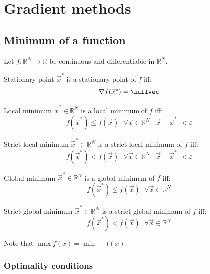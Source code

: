 \chapter{Gradient methods}


\section{Minimum of a function}

Let $f: \mathbb{R}^N \rightarrow \mathbb{R}$ be continuous and differentiable in $\mathbb{R}^N$.
\begin{descriptionlist}
    \item[Stationary point] 
        $\vec{x}^*$ is a stationary point of $f$ iff: 
        \[ \nabla f(\vec{x}^*) = \nullvec \]

    \item[Local minimum] 
        $\vec{x}^* \in \mathbb{R}^N$ is a local minimum of $f$ iff:
        \[ f(\vec{x}^*) \leq f(\vec{x}) \text{ } \forall \vec{x} \in \mathbb{R}^N: \Vert \vec{x} - \vec{x}^* \Vert < \varepsilon \]
        
    \item[Strict local minimum] 
        $\vec{x}^* \in \mathbb{R}^N$ is a strict local minimum of $f$ iff:
        \[ f(\vec{x}^*) < f(\vec{x}) \text{ } \forall \vec{x} \in \mathbb{R}^N: \Vert \vec{x} - \vec{x}^* \Vert < \varepsilon \]

    \item[Global minimum] 
        $\vec{x}^* \in \mathbb{R}^N$ is a global minimum of $f$ iff:
        \[ f(\vec{x}^*) \leq f(\vec{x}) \text{ } \forall \vec{x} \in \mathbb{R}^N \]
        
    \item[Strict global minimum] 
        $\vec{x}^* \in \mathbb{R}^N$ is a strict global minimum of $f$ iff:
        \[ f(\vec{x}^*) < f(\vec{x}) \text{ } \forall \vec{x} \in \mathbb{R}^N \]
\end{descriptionlist}

Note that $\max f(x) = \min -f(x)$.


\subsection{Optimality conditions}

